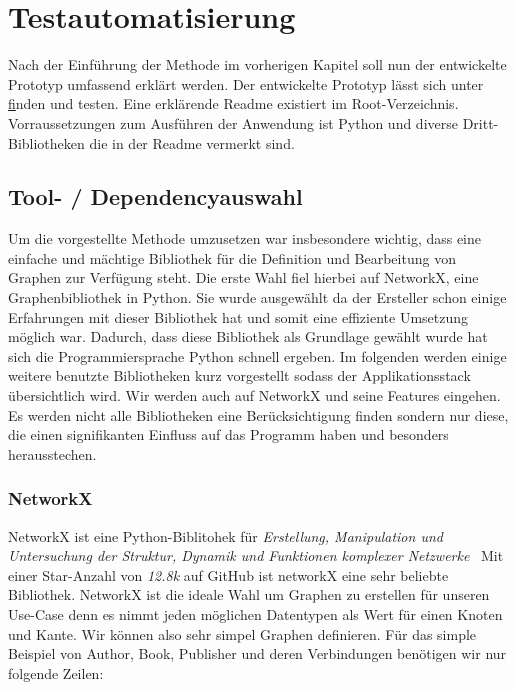 \chapter{Testautomatisierung}

Nach der Einführung der Methode im vorherigen Kapitel soll nun der entwickelte Prototyp umfassend erklärt werden.
Der entwickelte Prototyp lässt sich unter \href{https://github.com/gernhard1337/graphql-primepath-tester} finden und testen.
Eine erklärende Readme existiert im Root-Verzeichnis.
Vorraussetzungen zum Ausführen der Anwendung ist Python und diverse Dritt-Bibliotheken die in der Readme vermerkt sind.

\section{Tool- / Dependencyauswahl}
Um die vorgestellte Methode umzusetzen war insbesondere wichtig, dass eine einfache und mächtige Bibliothek für die Definition und Bearbeitung
von Graphen zur Verfügung steht.
Die erste Wahl fiel hierbei auf NetworkX, eine Graphenbibliothek in Python.
Sie wurde ausgewählt da der Ersteller schon einige Erfahrungen mit dieser Bibliothek hat und somit eine effiziente Umsetzung möglich war.
Dadurch, dass diese Bibliothek als Grundlage gewählt wurde hat sich die Programmiersprache Python schnell ergeben.
Im folgenden werden einige weitere benutzte Bibliotheken kurz vorgestellt sodass der Applikationsstack übersichtlich wird.
Wir werden auch auf NetworkX und seine Features eingehen.
Es werden nicht alle Bibliotheken eine Berücksichtigung finden sondern nur diese, die einen signifikanten Einfluss auf das Programm haben und besonders herausstechen.

\subsection{NetworkX}

NetworkX ist eine Python-Biblitohek für \textit{Erstellung, Manipulation und Untersuchung der Struktur, Dynamik und Funktionen komplexer Netzwerke}~\cite[vgl. Startseite]{networkx}
Mit einer Star-Anzahl von \textit{12.8k}\cite{networkxgithub} auf GitHub ist networkX eine sehr beliebte Bibliothek.
NetworkX ist die ideale Wahl um Graphen zu erstellen für unseren Use-Case denn es nimmt jeden möglichen Datentypen als Wert für einen Knoten und Kante.
Wir können also sehr simpel Graphen definieren.
Für das simple Beispiel von Author, Book, Publisher und deren Verbindungen benötigen wir nur folgende Zeilen:

